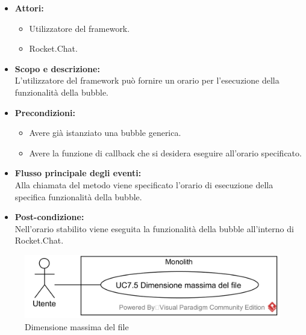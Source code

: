 \begin{itemize}
	\item \textbf{Attori:}
	\begin{itemize}
		\item Utilizzatore del framework.
		\item Rocket.Chat.
	\end{itemize}
	\item \textbf{Scopo e descrizione:} 
	\\L'utilizzatore del framework può fornire un orario per l'esecuzione della funzionalità della bubble.
	\item \textbf{Precondizioni:}
	\begin{itemize}
		\item Avere già istanziato una bubble generica.
		\item Avere la funzione di callback che si desidera eseguire all'orario specificato.
	\end{itemize}
	\item \textbf{Flusso principale degli eventi:}
	\\Alla chiamata del metodo viene specificato l'orario di esecuzione della specifica funzionalità della bubble.
	\item \textbf{Post-condizione:}
	\\Nell'orario stabilito viene eseguita la funzionalità della bubble all'interno di Rocket.Chat.
\end{itemize}

\begin{samepage}
\nopagebreak
\begin{figure}[H]
	\centering
	\includegraphics[width=15cm]{../../documenti/AnalisiDeiRequisiti/Diagrammi_img/usecase/uc1_11.png}
	\caption{\UCFCaption{} Dimensione massima del file}
\end{figure}
\end{samepage}

